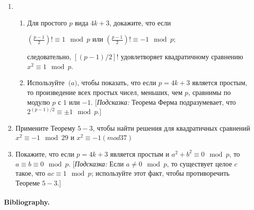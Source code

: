 \documentclass[11pt]{article}
\begin{document}
\begin{enumerate}
	\item\begin{enumerate}
		\item Для простого $p$ вида $4k+3$, докажите, что если 
		\begin{center}
			$(\frac{p-1}{2})!\equiv1\mod p$ или $(\frac{p-1}{2})!\equiv-1\mod p$;
		\end{center}
		следовательно, $[(p-1)/2]!$ удовлетворяет квадратичному сравнению $x^2\equiv1\mod p$.
		\item Используйте $\pod a$, чтобы показать, что если $p=4k+3$ является простым, то произведение всех простых чисел, меньших, чем $p$, сравнимы по модулю $p$ с $1$ или $-1$. [\textit{Подсказка:} Теорема Ферма подразумевает, что $2^{(p-1)/2}\equiv\pm1\mod p$.]
		\end{enumerate}
	\item Примените Теорему $5-3$, чтобы найти решения для квадратичных сравнений $x^2\equiv-1\mod 29$ и $x^2\equiv-1(mod 37)$
	\item Покажите, что если $p=4k+3$ является простым и $a^2+b^2\equiv0\mod p$, то $a\equiv b\equiv0\mod p$. [\textit{Подсказка:} Если $a\ne0\mod p$, то существует целое $c$ такое, что $ac\equiv1\mod p$; используйте этот факт, чтобы противоречить Теореме $5-3$.]
\end{enumerate}
\paragraph{Bibliography.}
\end{document}
